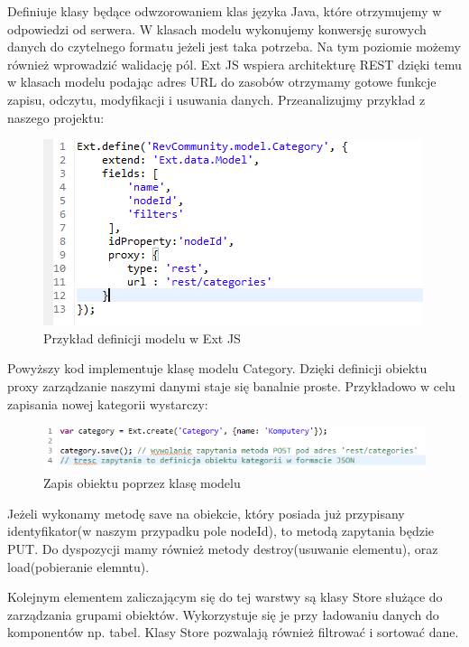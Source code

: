 Definiuje klasy będące odwzorowaniem klas języka Java, które otrzymujemy w odpowiedzi od serwera. W klasach modelu wykonujemy konwersję surowych danych do czytelnego formatu jeżeli jest taka potrzeba. Na tym poziomie możemy również wprowadzić walidację pól. Ext JS wspiera architekturę REST dzięki temu w klasach modelu podając adres URL do zasobów otrzymamy gotowe funkcje zapisu, odczytu, modyfikacji i usuwania danych. Przeanalizujmy przykład z naszego projektu:

\begin{figure}[H]
	\centering
	\includegraphics[width=\textwidth]{images/ext_model.png}
	\caption{Przykład definicji modelu w Ext JS}
\end{figure}

Powyższy kod implementuje klasę modelu Category. Dzięki definicji obiektu proxy zarządzanie naszymi danymi staje się banalnie proste. Przykładowo w celu zapisania nowej kategorii wystarczy:

\begin{figure}[H]
	\centering
	\includegraphics[width=\textwidth]{images/save_model.png}
	\caption{Zapis obiektu poprzez klasę modelu}
\end{figure}

Jeżeli wykonamy metodę save na obiekcie, który posiada już przypisany identyfikator(w naszym przypadku pole nodeId), to metodą zapytania będzie PUT.
Do dyspozycji mamy również metody destroy(usuwanie elementu), oraz load(pobieranie elemntu).

Kolejnym elementem zaliczającym się do tej warstwy są klasy Store służące do zarządzania grupami obiektów. Wykorzystuje się je przy ładowaniu danych do komponentów np. tabel. 
Klasy Store pozwalają również filtrować i sortować dane.

